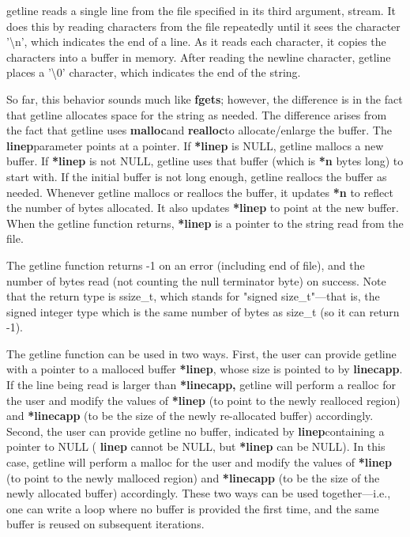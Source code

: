 \documentclass[11pt, a4paper]{article}
\begin{document}
getline reads a single line from the file specified in its third argument, stream. It does this by reading characters from the file repeatedly until it sees the character '\textbackslash n', which indicates the end of a line. As it reads each character, it copies the characters into a buffer in memory. After reading the newline character, getline places a '\textbackslash0' character, which indicates the end of the string.


So far, this behavior sounds much like \textbf{fgets}; however, the difference is in the fact that getline allocates space for the string as needed. The difference arises from the fact that getline uses \textbf{malloc}and \textbf{realloc}to allocate/enlarge the buffer. The \textbf{linep}parameter points at a pointer. If \textbf{*linep} is NULL, getline mallocs a new buffer. If \textbf{*linep} is not NULL, getline uses that buffer (which is \textbf{*n} bytes long) to start with. If the initial buffer is not long enough, getline reallocs the buffer as needed. Whenever getline mallocs or reallocs the buffer, it updates \textbf{*n} to reflect the number of bytes allocated. It also updates \textbf{*linep} to point at the new buffer. When the getline function returns, \textbf{*linep} is a pointer to the string read from the file.


The getline function returns -1 on an error (including end of file), and the number of bytes read (not counting the null terminator byte) on success. Note that the return type is ssize\_t, which stands for "signed size\_t"—that is, the signed integer type which is the same number of bytes as size\_t (so it can return -1).

The getline function can be used in two ways. First, the user can provide getline with a pointer to a malloced buffer \textbf{*linep}, whose size is pointed to by \textbf{linecapp}. If the line being read is larger than \textbf{*linecapp,} getline will perform a realloc for the user and modify the values of \textbf{*linep} (to point to the newly realloced region) and \textbf{*linecapp} (to be the size of the newly re-allocated buffer) accordingly. Second, the user can provide getline no buffer, indicated by \textbf{linep}containing a pointer to NULL ( \textbf{linep} cannot be NULL, but \textbf{*linep} can be NULL). In this case, getline will perform a malloc for the user and modify the values of \textbf{*linep} (to point to the newly malloced region) and \textbf{*linecapp} (to be the size of the newly allocated buffer) accordingly. These two ways can be used together—i.e., one can write a loop where no buffer is provided the first time, and the same buffer is reused on subsequent iterations.
\end{document}
